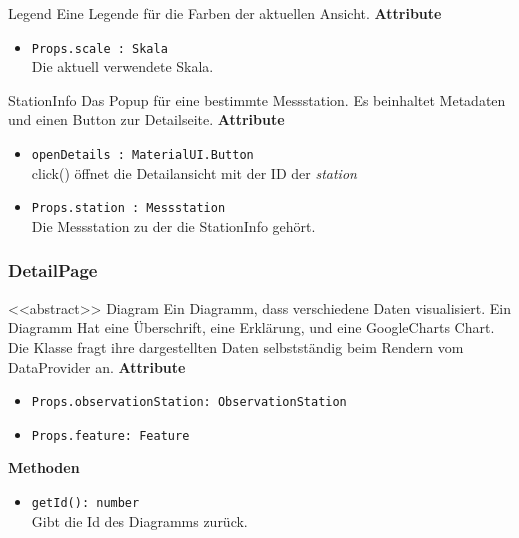     \begin{Class}{Legend}
        Eine Legende für die Farben der aktuellen Ansicht.
        \textbf{Attribute}
        \begin{itemize}
            \item \texttt{Props.scale : Skala}
            \\ Die aktuell verwendete Skala.
        \end{itemize}
    \end{Class}
    
    \begin{Class}{StationInfo}
        Das Popup für eine bestimmte Messstation. Es beinhaltet Metadaten und einen Button zur Detailseite.
        \textbf{Attribute}
        \begin{itemize}
            \item \texttt{openDetails : MaterialUI.Button}
            \\ click() öffnet die Detailansicht mit der ID der \emph{station}
            \item \texttt{Props.station : Messstation}
            \\ Die Messstation zu der die StationInfo gehört.
        \end{itemize}
    \end{Class}

\subsubsection{DetailPage}
    \begin{Class}{<<abstract>> Diagram}
        Ein Diagramm, dass verschiedene Daten visualisiert. Ein Diagramm Hat eine Überschrift, eine Erklärung, und eine GoogleCharts Chart. Die Klasse fragt ihre dargestellten Daten selbstständig beim Rendern vom DataProvider an.
        \textbf{Attribute}
        \begin{itemize}
            \item \texttt{Props.observationStation: ObservationStation}
            \item \texttt{Props.feature: Feature}
        \end{itemize}
        \textbf{Methoden}
        \begin{itemize}
            \item \texttt{getId(): number}
            \\Gibt die Id des Diagramms zurück.
        \end{itemize}
        

    \end{Class}

